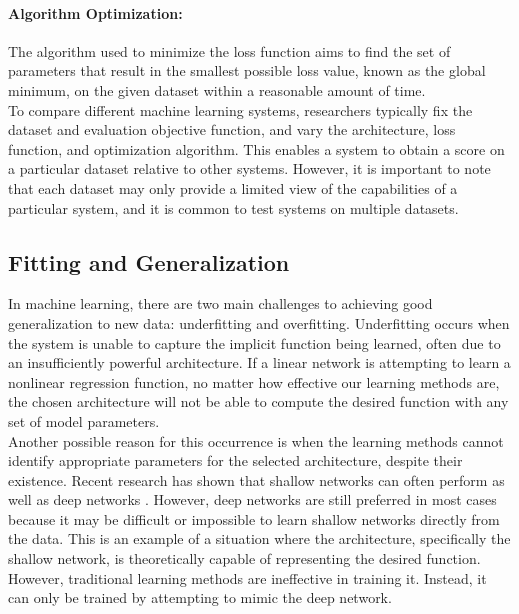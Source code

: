 \paragraph{Algorithm Optimization:} The algorithm used to minimize the loss function aims to find the set of parameters that result in the smallest possible loss value, known as the global minimum, on the given dataset within a reasonable amount of time. \\

\noindent To compare different machine learning systems, researchers typically fix the dataset and evaluation objective function, and vary the architecture, loss function, and optimization algorithm. This enables a system to obtain a score on a particular dataset relative to other systems. However, it is important to note that each dataset may only provide a limited view of the capabilities of a particular system, and it is common to test systems on multiple datasets.

\subsection[Fitting and Generalization]{Fitting and Generalization}

In machine learning, there are two main challenges to achieving good generalization to new data: underfitting and overfitting. Underfitting occurs when the system is unable to capture the implicit function being learned, often due to an insufficiently powerful architecture. If a linear network is attempting to learn a nonlinear regression function, no matter how effective our learning methods are, the chosen architecture will not be able to compute the desired function with any set of model parameters. \\

\noindent Another possible reason for this occurrence is when the learning methods cannot identify appropriate parameters for the selected architecture, despite their existence. Recent research has shown that shallow networks can often perform as well as deep networks \cite{ba2014deep}. However, deep networks are still preferred in most cases because it may be difficult or impossible to learn shallow networks directly from the data. This is an example of a situation where the architecture, specifically the shallow network, is theoretically capable of representing the desired function. However, traditional learning methods are ineffective in training it. Instead, it can only be trained by attempting to mimic the deep network. \\

